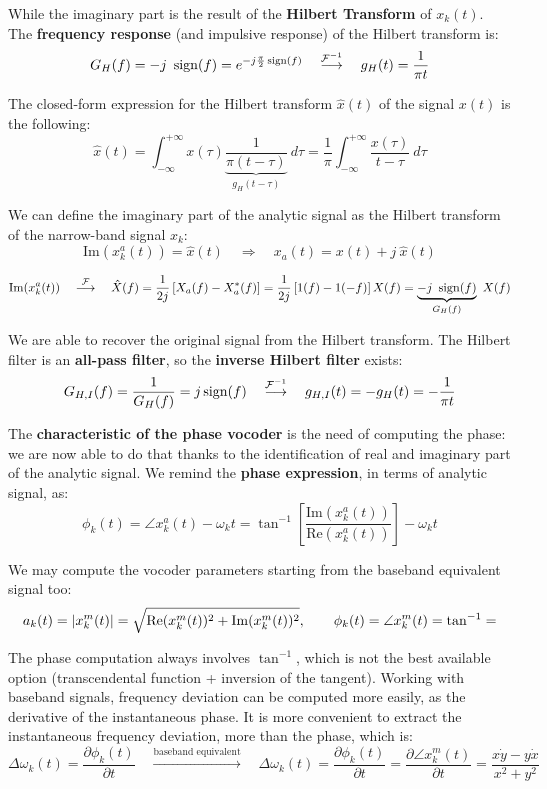 While the imaginary part is the result of the \textbf{Hilbert Transform} of $x_k(t)$.
The \textbf{frequency response} (and impulsive response) of the Hilbert transform is:
\[ G_H(f) = -j \ \sign(f) = e^{-j \frac{\pi}{2} \sign(f)} \quad \overset{\mathcal{F}^{-1}}{\longrightarrow} \quad g_H(t) = \frac{1}{\pi t} \]

The closed-form expression for the Hilbert transform $\hat{x}(t)$ of the signal $x(t)$ is the following:
\[ \hat{x}(t) = \int_{-\infty}^{+\infty} x(\tau) \underbrace{\frac{1}{\pi(t-\tau)}}_{g_H(t-\tau)} \ d\tau = \frac{1}{\pi} \int_{-\infty}^{+\infty} \frac{x(\tau)}{t-\tau} \ d\tau \]

We can define the imaginary part of the analytic signal as the Hilbert transform of the narrow-band signal $x_k$:
\[ \mathrm{Im}(x_k^a(t)) = \hat{x}(t) \quad \Rightarrow \quad x_a(t) = x(t) + j \ \hat{x}(t) \]

\[ \mathrm{Im}(x_k^a(t)) \quad \overset{\mathcal{F}}{\longrightarrow} \quad \hat{X}(f) = \frac{1}{2j} \left[ X_a(f) - X_a^*(f) \right] = \frac{1}{2j} \left[ 1(f) - 1(-f) \right] X(f) = \underbrace{-j \ \operatorname{sign}(f)}_{G_H(f)} \ X(f) \]

We are able to recover the original signal from the Hilbert transform.
The Hilbert filter is an \textbf{all-pass filter}, so the \textbf{inverse Hilbert filter} exists:
\[
G_{H,I} (f) = \frac{1}{G_H(f)} = j \operatorname{sign}(f) \quad \overset{\mathcal{F}^{-1}}{\longrightarrow} \quad g_{H,I}(t) = -g_H(t) = -\frac{1}{\pi t}
\]

The \textbf{characteristic of the phase vocoder} is the need of computing the phase: we are now able to do that thanks to the identification of real and imaginary part of the analytic signal.
We remind the \textbf{phase expression}, in terms of analytic signal, as:
\[ \phi_k(t) = \angle{x_k^a(t)} - \omega_k t = \tan^{-1} \left[ \frac{\mathrm{Im}(x_k^a(t))}{\mathrm{Re}(x_k^a(t))} \right] - \omega_k t \]

We may compute the vocoder parameters starting from the baseband equivalent signal too:
\[
a_k(t) = \abs{x_k^m(t)} = \sqrt{\mathrm{Re}(x_k^m(t))^2 + \mathrm{Im}(x_k^m(t))^2}, \qquad \phi_k(t) = \angle{x_k^m(t)} = \tan^{-1}  =

\]

The phase computation always involves $\tan^{-1}$, which is not the best available option (transcendental function + inversion of the tangent).
Working with baseband signals, frequency deviation can be computed more easily, as the derivative of the instantaneous phase.
It is more convenient to extract the instantaneous frequency deviation, more than the phase, which is:
\[ \Delta\omega_k(t) = \frac{\partial \phi_k(t)}{\partial t} \quad \overset{\text{baseband equivalent}}{\longrightarrow} \quad \Delta\omega_k(t) = \frac{\partial \phi_k(t)}{\partial t} = \frac{\partial \angle{x_k^m(t)}}{\partial t} = \frac{x \dot{y} - y \dot{x}}{x^2 + y^2}\]


